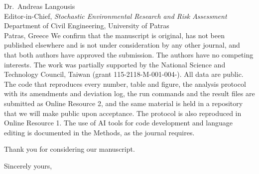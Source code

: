\documentclass[11pt,a4paper]{letter}
\begin{document}
\begin{letter}{Dr.\ Andreas Langousis\\
Editor-in-Chief, \emph{Stochastic Environmental Research and Risk Assessment}\\
Department of Civil Engineering, University of Patras\\
Patras, Greece}
We confirm that the manuscript is original, has not been published elsewhere and is not under
consideration by any other journal, and that both authors have approved the submission. The authors have no
competing interests. The work was partially supported by the National Science and Technology Council,
Taiwan (grant 115-2118-M-001-004-). All data are public. The code that reproduces every number, table and
figure, the analysis protocol with its amendments and deviation log, the run commands and the result files
are submitted as Online Resource 2, and the same material is held in a repository that we will make public
upon acceptance. The protocol is also reproduced in Online Resource 1. The use of AI tools for code
development and language editing is documented in the Methods, as the journal requires.

Thank you for considering our manuscript.

\closing{Sincerely yours,}

\end{letter}
\end{document}
